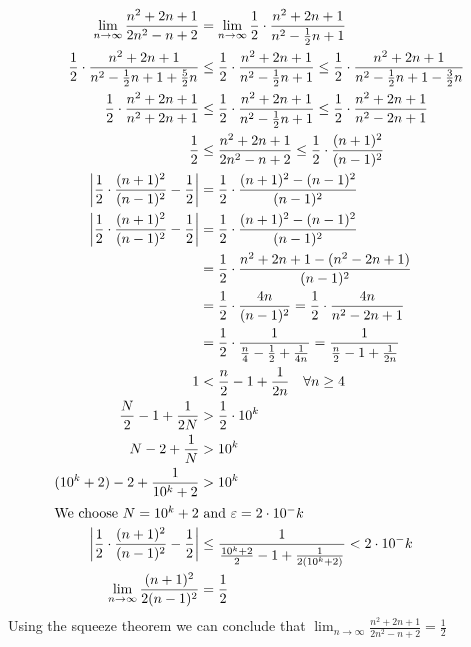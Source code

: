\documentclass[letterpaper]{article}
\begin{document}
\begin{enumerate}
\begin{enumerate}
\begin{enumerate}
    \begin{align*}
      \lim_{n\to\infty}\frac{n^2+2n+1}{2n^2-n+2}&=\lim_{n\to\infty}\frac{1}{2}\cdot\frac{n^2+2n+1}{n^2-\frac{1}{2}n+1}\\
      \frac{1}{2}\cdot\frac{n^2+2n+1}{n^2-\frac{1}{2}n+1+\frac{5}{2}n}&\le
      \frac{1}{2}\cdot\frac{n^2+2n+1}{n^2-\frac{1}{2}n+1}\le
      \frac{1}{2}\cdot\frac{n^2+2n+1}{n^2-\frac{1}{2}n+1-\frac{3}{2}n}\\
      \frac{1}{2}\cdot\frac{n^2+2n+1}{n^2+2n+1}&\le
      \frac{1}{2}\cdot\frac{n^2+2n+1}{n^2-\frac{1}{2}n+1}\le
      \frac{1}{2}\cdot\frac{n^2+2n+1}{n^2-2n+1}\\
      \frac{1}{2}&\le
      \frac{n^2+2n+1}{2n^2-n+2}\le
      \frac{1}{2}\cdot\frac{(n+1)^2}{(n-1)^2}\\
      \left\lvert\frac{1}{2}\cdot\frac{(n+1)^2}{(n-1)^2}-\frac{1}{2}\right\rvert&=\frac{1}{2}\cdot\frac{(n+1)^2-(n-1)^2}{(n-1)^2}\\
      \left\lvert\frac{1}{2}\cdot\frac{(n+1)^2}{(n-1)^2}-\frac{1}{2}\right\rvert&=\frac{1}{2}\cdot\frac{(n+1)^2-(n-1)^2}{(n-1)^2}\\
      &=\frac{1}{2}\cdot\frac{n^2+2n+1-(n^2-2n+1)}{(n-1)^2}\\
      &=\frac{1}{2}\cdot\frac{4n}{(n-1)^2}=\frac{1}{2}\cdot\frac{4n}{n^2-2n+1}\\
      &=\frac{1}{2}\cdot\frac{1}{\frac{n}{4}-\frac{1}{2}+\frac{1}{4n}}=\frac{1}{\frac{n}{2}-1+\frac{1}{2n}}\\
      1&<\frac{n}{2}-1+\frac{1}{2n}\quad\forall n\ge 4\\
      \frac{N}{2}-1+\frac{1}{2N}&>\frac{1}{2}\cdot10^k\\
      N-2+\frac{1}{N}&>10^k\\
      (10^k+2)-2+\frac{1}{10^k+2}&>10^k\\
      \intertext{We choose $N=10^k+2$ and $\varepsilon=2\cdot10^-k$}
      \left\lvert\frac{1}{2}\cdot\frac{(n+1)^2}{(n-1)^2}-\frac{1}{2}\right\rvert&\le\frac{1}{\frac{10^k+2}{2}-1+\frac{1}{2(10^k+2)}}<2\cdot10^-k\\
      \lim_{n\to\infty}\frac{(n+1)^2}{2(n-1)^2}&=\frac{1}{2}
    \end{align*}
    Using the squeeze theorem we can conclude that $\displaystyle \lim_{n\to\infty}\frac{n^2+2n+1}{2n^2-n+2}=\frac{1}{2}$


\end{enumerate}
\end{enumerate}
\end{enumerate}
\end{document}
